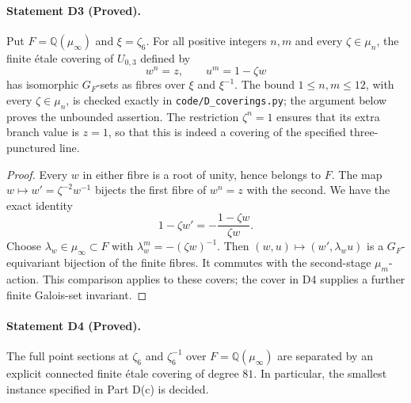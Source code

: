 \paragraph{Statement D3 (Proved).}\label{res:D3}
Put $F=\mathbb Q(\mu_\infty)$ and $\xi=\zeta_6$.  For all positive
integers $n,m$ and every $\zeta\in\mu_n$, the finite \'etale covering of
$U_{0,3}$ defined by
\[
 w^n=z,\qquad u^m=1-\zeta w
\]
has isomorphic $G_F$-sets as fibres over $\xi$ and $\xi^{-1}$.
The bound $1\leq n,m\leq12$, with every $\zeta\in\mu_n$, is checked
exactly in \texttt{code/D\_coverings.py}; the argument below proves the
unbounded assertion.  The restriction $\zeta^n=1$ ensures that its extra
branch value is $z=1$, so that this is indeed a covering of the specified
three-punctured line.

\begin{proof}
Every $w$ in either fibre is a root of unity, hence belongs to $F$.
The map $w\mapsto w'=\zeta^{-2}w^{-1}$ bijects the first fibre of $w^n=z$
with the second.  We have the exact identity
\[
 1-\zeta w'=-\frac{1-\zeta w}{\zeta w}.
\]
Choose $\lambda_w\in\mu_\infty\subset F$ with
$\lambda_w^m=-(\zeta w)^{-1}$.  Then
$(w,u)\mapsto(w',\lambda_w u)$ is a $G_F$-equivariant bijection of the
finite fibres.  It commutes with the second-stage $\mu_m$-action.  This
comparison applies to these covers; the cover in D4 supplies a further
finite Galois-set invariant.
\end{proof}

\paragraph{Statement D4 (Proved).}\label{res:D4}
The full point sections at $\zeta_6$ and $\zeta_6^{-1}$ over
$F=\mathbb Q(\mu_\infty)$ are separated by an explicit connected finite
\'etale covering of degree $81$.  In particular, the smallest instance
specified in Part D(c) is decided.

